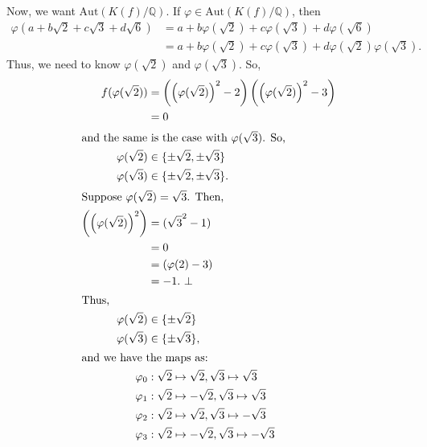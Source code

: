 \documentclass[8pt]{extarticle}
\newcommand{\Q}{\mathbb{Q}}
\begin{document}
  Now, we want $\text{Aut}(K(f)/\Q)$. If $\varphi\in \text{Aut}(K(f)/\Q)$, then
  \begin{align*}
    \varphi(a+b\sqrt{2}+c\sqrt{3}+d\sqrt{6}) &= a+b\varphi(\sqrt{2}) + c\varphi(\sqrt{3}) + d\varphi(\sqrt{6})\\
                                             &= a+b\varphi(\sqrt{2}) + c\varphi(\sqrt{3}) + d\varphi(\sqrt{2})\varphi(\sqrt{3}).
  \end{align*}
  Thus, we need to know $\varphi(\sqrt{2})$ and $\varphi(\sqrt{3})$. So,
  \begin{align*}
    f(\varphi(\sqrt{2})) &= \left(\left(\varphi(\sqrt{2})\right)^2 - 2\right)\left(\left(\varphi(\sqrt{2})\right)^2-3\right)\\
                         &= 0\\
                         \shortintertext{and the same is the case with $\varphi(\sqrt{3})$. So,}
    \varphi(\sqrt{2}) &\in \{\pm\sqrt{2}, \pm\sqrt{3}\}\\
    \varphi(\sqrt{3}) &\in \{\pm\sqrt{2},\pm\sqrt{3}\}.\\
    \shortintertext{Suppose $\varphi(\sqrt{2}) = \sqrt{3}$. Then,}
    \left(\left(\varphi(\sqrt{2})\right)^2\right) &= (\sqrt{3}^2-1)\\
                                                  &= 0\\
                                                  &=\left(\varphi(2)-3\right)\\
                                                  &= -1.~\bot\\
                                                  \shortintertext{Thus,}
    \varphi(\sqrt{2}) &\in \{\pm\sqrt{2}\}\\
    \varphi(\sqrt{3}) &\in \{\pm\sqrt{3}\},\\
    \shortintertext{and we have the maps as:}
    \varphi_0&: \sqrt{2}\mapsto\sqrt{2},\sqrt{3}\mapsto\sqrt{3}\\
    \varphi_1&: \sqrt{2}\mapsto-\sqrt{2},\sqrt{3}\mapsto\sqrt{3}\\
    \varphi_2&: \sqrt{2}\mapsto\sqrt{2},\sqrt{3}\mapsto-\sqrt{3}\\
    \varphi_3&: \sqrt{2}\mapsto-\sqrt{2},\sqrt{3}\mapsto-\sqrt{3}\\
  \end{align*}
\end{document}
